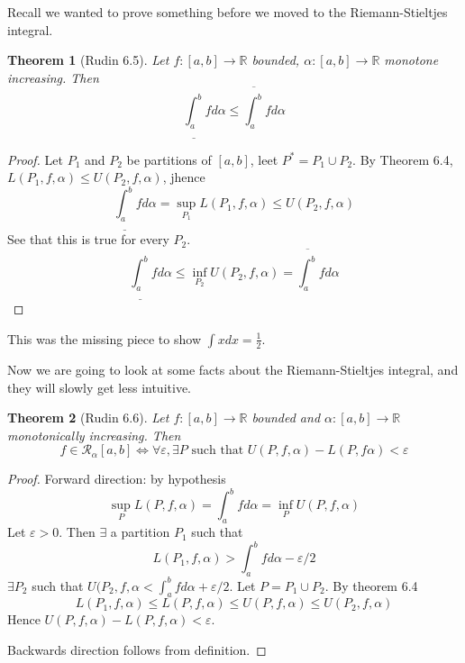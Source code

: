 \documentclass{article}
\theoremstyle{plain}
\newtheorem{theorem}{Theorem}
\theoremstyle{remark}
\newcommand{\R}{{\mathbb R}}
\newcommand{\ep}{{\varepsilon}}
\begin{document}
Recall we wanted to prove something before we moved to the Riemann-Stieltjes integral.
\begin{theorem}[Rudin 6.5]
	Let $f \colon [a,b] \to \R$ bounded,
	$\alpha \colon [a,b] \to \R$ monotone increasing. Then
	\[
		\underline{\int_a^b} fd\alpha \leq \overline{\int_a^b}fd\alpha
	\]
\end{theorem}
\begin{proof}
	Let $P_1$ and $P_2$ be partitions of $[a,b]$, leet $P^* = P_1 \cup P_2$.
	By Theorem 6.4, $L(P_1,f,\alpha) \leq U(P_2,f,\alpha)$, jhence
	\[
		\underline{\int_a^b}fd\alpha = \sup_{P_1} L(P_1,f,\alpha)
		\leq U(P_2,f,\alpha)
	\]
	See that this is true for every $P_2$.
	\[
		\underline{\int_a^b}fd\alpha \leq \inf_{P_2} U(P_2,f,\alpha)
		= \overline{\int_a^b}fd\alpha
	\]
\end{proof}
This was the missing piece to show $\int xdx = \frac12$.

Now we are going to look at some facts about the Riemann-Stieltjes integral,
and they will slowly get less intuitive.
\begin{theorem}[Rudin 6.6]
	Let $f \colon [a,b] \to \R$ bounded and
	$\alpha \colon [a,b] \to \R$ monotonically increasing. Then
	\[
		f \in \mathcal{R}_\alpha[a,b] \iff
		\forall \ep, \exists P \text{ such that }U(P,f,\alpha) - L(P,f\alpha) < \ep
	\]
\end{theorem}
\begin{proof}
	Forward direction: by hypothesis
	\[
		\sup_P L(P,f,\alpha) = \int_a^b fd\alpha = \inf_P U(P,f,\alpha)
	\]
	Let $\ep > 0$. Then $\exists$ a partition $P_1$ such that
	\[
		L(P_1,f,\alpha) > \int_a^b fd\alpha - \ep/2
	\]
	$\exists P_2$ such that $U(P_2,f,\alpha < \int_a^b fd\alpha + \ep/2$.
	Let $P = P_1 \cup P_2$.
	By theorem 6.4
	\[
		L(P_1,f,\alpha) \leq L(P,f,\alpha)
		\leq U(P,f,\alpha) \leq U(P_2,f,\alpha)
	\]
	Hence $U(P,f,\alpha) - L(P,f,\alpha) < \ep$.

	Backwards direction follows from definition.
\end{proof}
\end{document}

